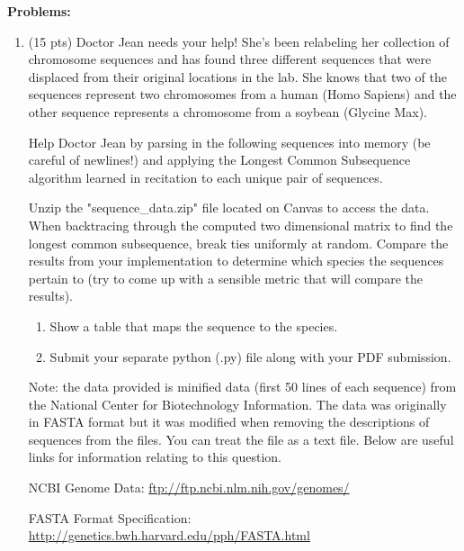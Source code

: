 \documentclass[12pt]{article}
\begin{document}
\vspace{2mm}
\noindent
{\bf Problems:}
\begin{enumerate}

	\item (15 pts) Doctor Jean needs your help! She's been relabeling her collection of chromosome sequences and has found three different sequences that were displaced from their original locations in the lab. She knows that two of the sequences represent two chromosomes from a human (Homo Sapiens) and the other sequence represents a chromosome from a soybean (Glycine Max).

    Help Doctor Jean by parsing in the following sequences into memory (be careful of newlines!) and applying the Longest Common Subsequence algorithm learned in recitation to each unique pair of sequences.
    
    Unzip the "sequence\_data.zip" file located on Canvas to access the data. When backtracing through the computed two dimensional matrix to find the longest common subsequence, break ties uniformly at random. Compare the results from your implementation to determine which species the sequences pertain to (try to come up with a sensible metric that will compare the results). \begin{enumerate}
    \item Show a table that maps the sequence to the species.
    \item Submit your separate python (.py) file along with your PDF submission.

\end{enumerate}

Note: the data provided is minified data (first 50 lines of each sequence) from the National Center for Biotechnology Information.  The data was originally in FASTA format but it was modified when removing the descriptions of sequences from the files.  You can treat the file as a text file.  Below are useful links for information relating to this question.

NCBI Genome Data: \href{ftp://ftp.ncbi.nlm.nih.gov/genomes/}{ftp://ftp.ncbi.nlm.nih.gov/genomes/}

FASTA Format Specification: \href{http://genetics.bwh.harvard.edu/pph/FASTA.html}{http://genetics.bwh.harvard.edu/pph/FASTA.html}


\end{enumerate}
\end{document}
